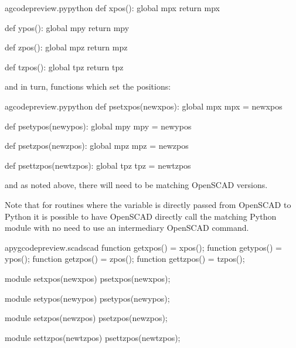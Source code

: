 \documentclass{ltxdoc}
\begin{document}
\lstset{firstnumber=\thegcpy}
\begin{writecode}{a}{gcodepreview.py}{python}
def xpos():
    global mpx
    return mpx

def ypos():
    global mpy
    return mpy

def zpos():
    global mpz
    return mpz

def tzpos():
    global tpz
    return tpz

\end{writecode}
\addtocounter{gcpy}{16}

\noindent and in turn, functions which set the positions: 

\lstset{firstnumber=\thegcpy}
\begin{writecode}{a}{gcodepreview.py}{python}
def psetxpos(newxpos):
    global mpx
    mpx = newxpos

def psetypos(newypos):
    global mpy
    mpy = newypos

def psetzpos(newzpos):
    global mpz
    mpz = newzpos
 
def psettzpos(newtzpos):
    global tpz
    tpz = newtzpos

\end{writecode}
\addtocounter{gcpy}{16}
 
\noindent and as noted above, there will need to be matching OpenSCAD versions. 

\noindent{}%
%
%
%
%
%
%
%
Note that for routines where the variable is directly passed from OpenSCAD to Python
it is possible to have OpenSCAD directly call the matching Python module with no need
to use an intermediary OpenSCAD command.
 
\lstset{firstnumber=\thepyscad}
\begin{writecode}{a}{pygcodepreview.scad}{scad}
function getxpos() = xpos();
function getypos() = ypos();
function getzpos() = zpos();
function gettzpos() = tzpos();

module setxpos(newxpos) {
    psetxpos(newxpos);
}

module setypos(newypos) {
    psetypos(newypos);
}

module setzpos(newzpos) {
    psetzpos(newzpos);
}

module settzpos(newtzpos) {
    psettzpos(newtzpos);
}

\end{writecode}
\addtocounter{pyscad}{21}
 
\end{document}
